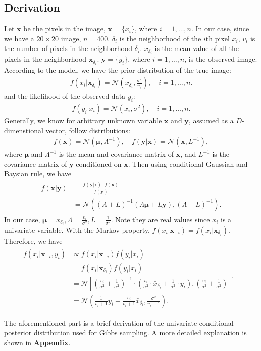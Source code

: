 \subsection{Derivation}
Let $\mathbf{x}$ be the pixels in the image, $\mathbf{x} = \{x_i\}$, where $i = 1,\dots, n$. In our case, since we have a $20\times 20$ image, $n=400$. $\delta_i$ is the neighborhood of the $i$th pixel $x_i$, $v_i$ is the number of pixels in the neighborhood $\delta_i$. $\bar{x}_{\delta_i}$ is the mean value of all the pixels in the neighborhood $\mathbf{x}_{\delta_i}$. $\mathbf{y} = \{y_i\} $, where $i = 1, \dots, n$,  is the observed image.
According to the model, we have the prior distribution of the true image:
\begin{align}
f(x_i|\mathbf{x}_{\delta_i})=\mathcal{N}\left(\bar{x}_{\delta_i}, \frac{\sigma^2}{v_i}\right),\quad i=1,\dots,n.\end{align}
and the likelihood of the observed data $y_i$: 
\begin{align}
f(y_i|x_i)= \mathcal{N}\left(x_i,\sigma^2\right),\quad i=1,\dots,n.
\end{align}
Generally, we know for arbitrary unknown variable $\mathbf{x}$ and $\mathbf{y}$, assumed as a $D$-dimenstional vector, follow distributions: 
\begin{align}
f(\mathbf{x})=\mathcal{N}\left(\mathbf{\mu},\Lambda^{-1}\right), \quad f(\mathbf{y}|\mathbf{x})=\mathcal{N}(\mathbf{x},L^{-1}),
\end{align}
where $\mathbf{\mu}$ and $\Lambda^{-1}$ is the mean and covariance matrix of $\mathbf{x}$, and $L^{-1}$ is the covariance matrix of $\mathbf{y}$ conditioned on $\mathbf{x}$.
Then using conditional Gaussian and Baysian rule, we have
\begin{align}
\begin{split}
f(\mathbf{x}|\mathbf{y}) & = \frac{f(\mathbf{y}|\mathbf{x})\cdot f(\mathbf{x})}{f(\mathbf{y})} \\
						 & =\mathcal{N}\left((\Lambda+L)^{-1}(\Lambda{\mathbf{\mu}} + L\mathbf{y}),(\Lambda+L)^{-1}\right).
\end{split}
\end{align}
In our case, $\mathbf{\mu}=\bar{x}_{\delta_i},\Lambda=\frac{v_i}{\sigma^2}, L = \frac{1}{\sigma^2}$. Note they are real values since $x_i$ is a univariate variable.
With the Markov property, $f(x_i|\mathbf{x}_{-i}) = f(x_i|\mathbf{x}_{\delta_i})$. Therefore, we have
\begin{align}
\begin{split}
f(x_i|\mathbf{x}_{-i}, y_i) & \propto f(x_i|\mathbf{x}_{-i})f(y_i|x_i) \\
							& = f(x_i|\mathbf{x}_{\delta_i})f(y_i|x_i) \\
    & =\mathcal{N}\left[\left(\frac{v_i}{\sigma^2}+\frac{1}{\sigma^2}\right)^{-1} \cdot \left(\frac{v_i}{\sigma^2}\cdot\bar{x}_{\delta_i} + \frac{1}{\sigma^2}\cdot y_i\right),\left(\frac{v_i}{\sigma^2}+\frac{1}{\sigma^2}\right)^{-1}\right]\\
    & =\mathcal{N}\left(\frac{1}{v_i+1}y_i+\frac{v_i}{v_i+1}\bar{x}_{\delta_i},\frac{\sigma^2}{v_i+1}\right).
\end{split}
\end{align}

The aforementioned part is a brief derivation of the univariate conditional posterior distribution used for Gibbs sampling. A more detailed explanation is shown in \textbf{Appendix}.